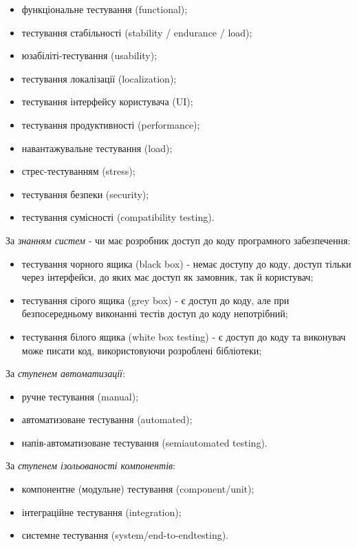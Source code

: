 \begin{itemize}
    \item функціональне тестування (functional);
    \item тестування стабільності (stability / endurance / load);
    \item юзабіліті-тестування (usability);
    \item тестування локалізації (localization);
    \item тестування інтерфейсу користувача (UI);
    \item тестування продуктивності (performance);
    \item навантажувальне тестування (load);
    \item стрес-тестуванням (stress);
    \item тестування безпеки (security);
    \item тестування сумісності (compatibility testing).
\end{itemize}

За \emph{знанням систем} - чи має розробник доступ до коду програмного забезпечення:

\begin{itemize}
    \item тестування чорного ящика (black box) - немає доступу до коду,
      доступ тільки через інтерфейси, до яких має доступ як замовник, так й користувач;
    \item тестування сірого ящика (grey box) - є доступ до коду,
      але при безпосередньому виконанні тестів доступ до коду непотрібний;
    \item тестування білого ящика (white box testing) - є доступ до коду
      та виконувач може писати код, використовуючи розроблені бібліотеки;
\end{itemize}

За \emph{ступенем автоматизації}:

\begin{itemize}
    \item ручне тестування (manual);
    \item автоматизоване тестування (automated);
    \item напів-автоматизоване тестування (semiautomated testing).
\end{itemize}

За \emph{ступенем ізольованості компонентів}:

\begin{itemize}
    \item компонентне (модульне) тестування (component/unit);
    \item інтеграційне тестування (integration);
    \item системне тестування (system/end-to-endtesting).
\end{itemize}

